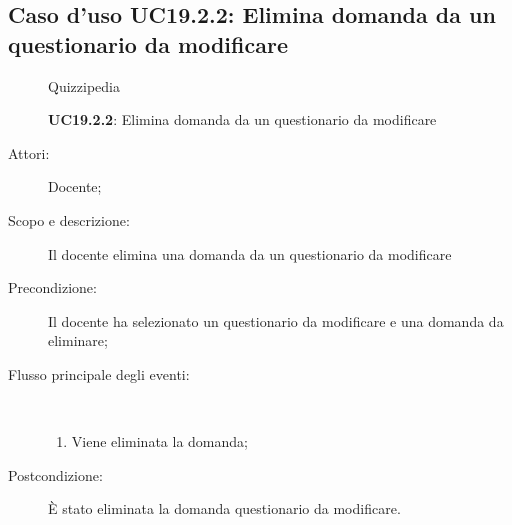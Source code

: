 \subsection{Caso d'uso UC19.2.2: Elimina domanda da un questionario da  modificare}
	\begin{figure}[H]
		\centering
		\begin{resizedtikzpicture}{\textwidth}
		\begin{umlsystem}[x=0, fill=lightgray!20]{Quizzipedia}
		\end{umlsystem}
		\end{resizedtikzpicture}
		\caption{\textbf{UC19.2.2}: Elimina domanda da un questionario da  modificare}
		\label{UC19.2.2}
	\end{figure}
\begin{description}
\item[Attori:] Docente;
\item[Scopo e descrizione:] Il docente elimina una domanda da un questionario da modificare
      \item[Precondizione:] Il docente ha selezionato un questionario da modificare e una domanda da eliminare;

        \item[Flusso principale degli eventi:] \ 
 \begin{enumerate}
          \item Viene eliminata la domanda;

      \end{enumerate}
    \item[Postcondizione:] È stato eliminata la domanda questionario da modificare.
  \end{description}
\hypertarget{UC19.2.3}{}
